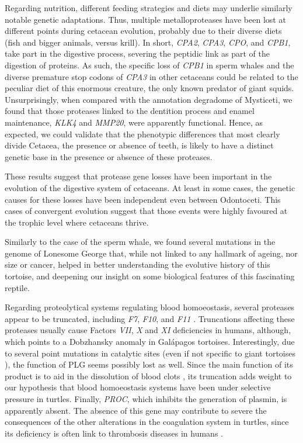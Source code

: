 Regarding nutrition, different feeding strategies and diets may underlie similarly notable genetic adaptations.
Thus, multiple metalloproteases have been lost at different points during cetacean evolution, probably due to their diverse diets (fish and bigger animals, versus krill).
In short, \textit{CPA2}, \textit{CPA3}, \textit{CPO}, and \textit{CPB1}, take part in the digestive process, severing the peptidic link as part of the digestion of proteins.
As such, the specific loss of \textit{CPB1} in sperm whales and the diverse premature stop codons of \textit{CPA3} in other cetaceans could be related to the peculiar diet of this enormous creature, the only known predator of giant squids.
Unsurprisingly, when compared with the annotation degradome of Mysticeti, we found that those proteases linked to the dentition process and enamel maintenance, \textit{KLK4} and \textit{MMP20}, were apparently functional.
Hence, as expected, we could validate that the phenotypic differences that most clearly divide Cetacea, the presence or absence of teeth, is likely to have a distinct genetic base in the presence or absence of these proteases.

These results suggest that protease gene losses have been important in the evolution of the digestive system of cetaceans.
At least in some cases, the genetic causes for these losses have been independent even between Odontoceti.
This cases of convergent evolution suggest that those events were highly favoured at the trophic level where cetaceans thrive.

Similarly to the case of the sperm whale, we found several mutations in the genome of Lonesome George that, while not linked to any hallmark of ageing, nor size or cancer, helped in better understanding the evolutive history of this tortoise, and deepening our insight on some biological features of this fascinating reptile.

Regarding proteolytical systems regulating blood homoeostasis, several proteases appear to be truncated, including \textit{F7}, \textit{F10}, and \textit{F11}%
.
Truncations affecting these proteases usually cause Factors \textsl{VII}, \textsl{X} and \textsl{XI} deficiencies in humans, although, which points to a Dobzhansky anomaly in Gal\'{a}pagos tortoises.
Interestingly, due to several point mutations in catalytic sites (even if not specific to giant tortoises%
), the function of PLG seems possibly lost as well.
Since the main function of its product is to aid in the dissolution of blood clots \cite{Wu2019}, its truncation adds weight to our hypothesis that blood homoeostasis systems have been under selective pressure in turtles.
Finally, \textit{PROC}, which inhibits the generation of plasmin, is apparently absent.
The absence of this gene may contribute to severe the consequences of the other alterations in the coagulation system in turtles, since its deficiency is often link to thrombosis diseases in humans \cite{Cheng2016}. 

